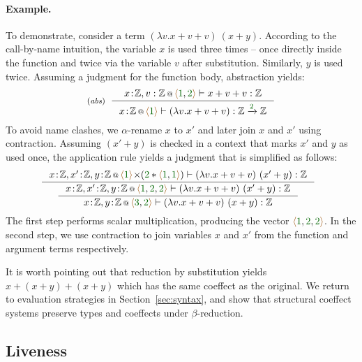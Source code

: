 \paragraph{Example.} To demonstrate, consider a term
$(\lambda v.x+v+v)~(x+y)$. According to the call-by-name intuition, the variable $x$ is used three 
times -- once directly inside the function and twice via the variable $v$ after 
substitution. Similarly, $y$ is used 
twice. Assuming a judgment for the function body, abstraction yields:
%
\begin{equation*}
\tyrule{abs}
 { \coctx{x\!:\!\mathbb{Z},v:\mathbb{Z}}{\alift{\cclrd{1},\cclrd{2}}} \vdash x+v+v : \mathbb{Z} }
 { \coctx{x\!:\!\mathbb{Z}}{\alift{\cclrd{1}}} \vdash (\lambda v.x+v+v) : \mathbb{Z} \xrightarrow{\cclrd{2}} \mathbb{Z} }
\end{equation*}
%
To avoid name clashes, we $\alpha$-rename $x$ to $x'$ and later join $x$ and $x'$ using contraction.
Assuming $(x'+y)$ is checked in a context that marks $x'$ and $y$ as used once, the application rule yields
a judgment that is simplified as follows:
\[
\hspace{-0.7em}\inference
  { \coctx{x\!:\!\mathbb{Z},x'\!:\!\mathbb{Z},y\!:\!\mathbb{Z}}
          {\alift{\cclrd{1}} \cons (\cclrd{2} \ast \alift{\cclrd{1},\cclrd{1}}) } \vdash (\lambda v.x+v+v)~(x'+y) : \mathbb{Z} }
{\inference
  { \coctx{x\!:\!\mathbb{Z},x'\!:\!\mathbb{Z},y\!:\!\mathbb{Z}}{\alift{\cclrd{1}, \cclrd{2}, \cclrd{2}} } \vdash (\lambda v.x+v+v)~(x'+y) : \mathbb{Z} }
  { \coctx{x\!:\!\mathbb{Z},y\!:\!\mathbb{Z}}{\alift{\cclrd{3}, \cclrd{2}}} \vdash (\lambda v.x+v+v)~(x+y)  : \mathbb{Z}} }
\]
%
The first step performs scalar multiplication, producing the vector
$\alift{\cclrd{1},\cclrd{2},\cclrd{2}}$. In the second step, we use contraction to join variables 
$x$ and $x'$ from the function and argument terms respectively.

It is worth pointing out that reduction by substitution yields $x+(x+y)+(x+y)$ which has the same coeffect as
the original. We return to evaluation strategies in Section~\ref{sec:syntax}, and 
show that structural coeffect systems preserve types and coeffects under $\beta$-reduction. 


\subsection{Liveness}
\label{sec:applications-struct-live}

